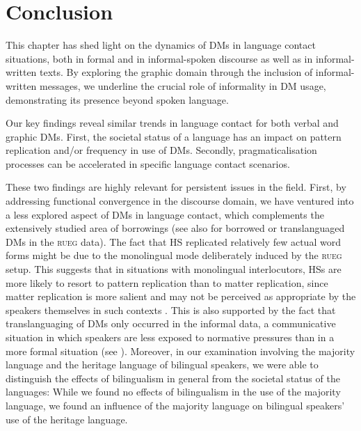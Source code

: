 \documentclass[output=paper,colorlinks,citecolor=brown]{langscibook}
\begin{document}
\section{Conclusion}
\label{sec:labrenzetal:Conclusion}
This chapter has shed light on the dynamics of DMs in language contact situations, both in formal and in informal-spoken discourse as well as in informal-written texts. By exploring the graphic domain through the inclusion of informal-written messages, we underline the crucial role of informality in DM usage, demonstrating its presence beyond spoken language.

Our key findings reveal similar trends in language contact for both verbal and graphic DMs. First, the societal status of a language has an impact on pattern replication and/or frequency in use of DMs. Secondly, pragmaticalisation processes can be accelerated in specific language contact scenarios. 

These two findings are highly relevant for persistent issues in the field. First, by addressing functional convergence in the discourse domain, we have ventured into a less explored aspect of DMs in language contact, which complements the extensively studied area of borrowings (see also \cite{chapters/02} for borrowed or translanguaged DMs in the \textsc{rueg} data). The fact that HS replicated relatively few actual word forms might be due to the monolingual mode deliberately induced by the \textsc{rueg} setup. This suggests that in situations with monolingual interlocutors, HSs are more likely to resort to pattern replication than to matter replication, since matter replication is more salient and may not be perceived as appropriate by the speakers themselves in such contexts \citep[cf.][]{matras_contact_2010}. This is also supported by the fact that translanguaging of DMs only occurred in the informal data, a communicative situation in which speakers are less exposed to normative pressures than in a more formal situation (see \cite{chapters/02}). Moreover, in our examination involving the majority language and the heritage language of bilingual speakers, we were able to distinguish the effects of bilingualism in general from the societal status of the languages: While we found no effects of bilingualism in the use of the majority language, we found an influence of the majority language on bilingual speakers’ use of the heritage language. 
\end{document}
